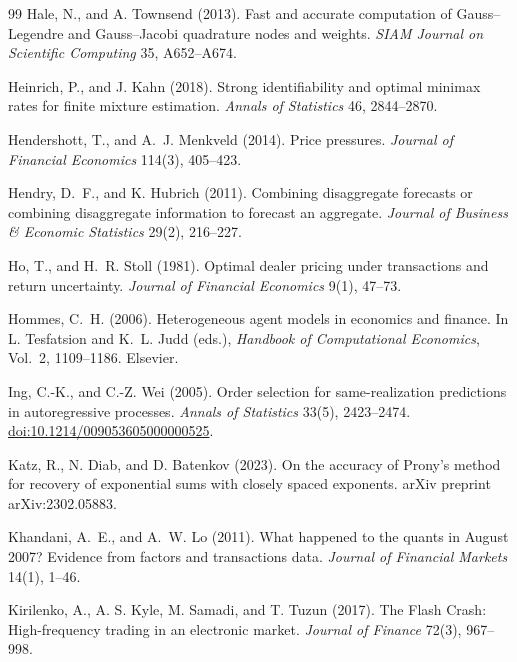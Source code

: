 \documentclass[12pt]{article}
\theoremstyle{definition}
\theoremstyle{remark}
\begin{document}
\begin{thebibliography}{99}
 Hale, N., and A. Townsend (2013). Fast and accurate computation of Gauss--Legendre and Gauss--Jacobi quadrature nodes and weights. \emph{SIAM Journal on Scientific Computing} 35, A652--A674.

 Heinrich, P., and J. Kahn (2018). Strong identifiability and optimal minimax rates for finite mixture estimation. \emph{Annals of Statistics} 46, 2844--2870.

 Hendershott, T., and A.~J. Menkveld (2014). Price pressures. \emph{Journal of Financial Economics} 114(3), 405--423.

 Hendry, D.~F., and K. Hubrich (2011). Combining disaggregate forecasts or combining disaggregate information to forecast an aggregate. \emph{Journal of Business \& Economic Statistics} 29(2), 216--227.

 Ho, T., and H.~R. Stoll (1981). Optimal dealer pricing under transactions and return uncertainty. \emph{Journal of Financial Economics} 9(1), 47--73.

 Hommes, C.~H. (2006). Heterogeneous agent models in economics and finance. In L. Tesfatsion and K.~L. Judd (eds.), \emph{Handbook of Computational Economics}, Vol.~2, 1109--1186. Elsevier.

 Ing, C.-K., and C.-Z. Wei (2005). Order selection for same-realization predictions in autoregressive processes. \emph{Annals of Statistics} 33(5), 2423--2474. \href{https://doi.org/10.1214/009053605000000525}{doi:10.1214/009053605000000525}.

 Katz, R., N. Diab, and D. Batenkov (2023). On the accuracy of Prony's method for recovery of exponential sums with closely spaced exponents. arXiv preprint arXiv:2302.05883.

 Khandani, A.~E., and A.~W. Lo (2011). What happened to the quants in August 2007? Evidence from factors and transactions data. \emph{Journal of Financial Markets} 14(1), 1--46.

 Kirilenko, A., A. S. Kyle, M. Samadi, and T. Tuzun (2017). The Flash Crash: High-frequency trading in an electronic market. \emph{Journal of Finance} 72(3), 967--998.


\end{thebibliography}
\end{document}
